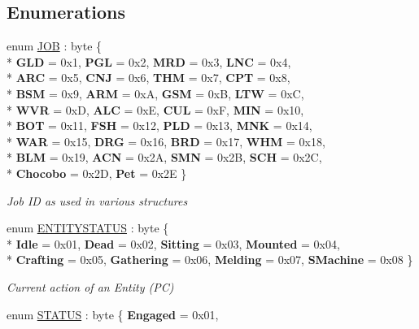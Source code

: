 \subsection*{Enumerations}
\begin{DoxyCompactItemize}
\item 
enum \hyperlink{namespaceffxivlib_a7273810711af045adb7151580e025a86}{J\-O\-B} \-: byte \{ \\*
{\bfseries G\-L\-D} = 0x1, 
{\bfseries P\-G\-L} = 0x2, 
{\bfseries M\-R\-D} = 0x3, 
{\bfseries L\-N\-C} = 0x4, 
\\*
{\bfseries A\-R\-C} = 0x5, 
{\bfseries C\-N\-J} = 0x6, 
{\bfseries T\-H\-M} = 0x7, 
{\bfseries C\-P\-T} = 0x8, 
\\*
{\bfseries B\-S\-M} = 0x9, 
{\bfseries A\-R\-M} = 0x\-A, 
{\bfseries G\-S\-M} = 0x\-B, 
{\bfseries L\-T\-W} = 0x\-C, 
\\*
{\bfseries W\-V\-R} = 0x\-D, 
{\bfseries A\-L\-C} = 0x\-E, 
{\bfseries C\-U\-L} = 0x\-F, 
{\bfseries M\-I\-N} = 0x10, 
\\*
{\bfseries B\-O\-T} = 0x11, 
{\bfseries F\-S\-H} = 0x12, 
{\bfseries P\-L\-D} = 0x13, 
{\bfseries M\-N\-K} = 0x14, 
\\*
{\bfseries W\-A\-R} = 0x15, 
{\bfseries D\-R\-G} = 0x16, 
{\bfseries B\-R\-D} = 0x17, 
{\bfseries W\-H\-M} = 0x18, 
\\*
{\bfseries B\-L\-M} = 0x19, 
{\bfseries A\-C\-N} = 0x2\-A, 
{\bfseries S\-M\-N} = 0x2\-B, 
{\bfseries S\-C\-H} = 0x2\-C, 
\\*
{\bfseries Chocobo} = 0x2\-D, 
{\bfseries Pet} = 0x2\-E
 \}
\begin{DoxyCompactList}\small\item\em Job I\-D as used in various structures \end{DoxyCompactList}\item 
enum \hyperlink{namespaceffxivlib_a93f054414b7ccf7ba7c36f54fcc392f5}{E\-N\-T\-I\-T\-Y\-S\-T\-A\-T\-U\-S} \-: byte \{ \\*
{\bfseries Idle} = 0x01, 
{\bfseries Dead} = 0x02, 
{\bfseries Sitting} = 0x03, 
{\bfseries Mounted} = 0x04, 
\\*
{\bfseries Crafting} = 0x05, 
{\bfseries Gathering} = 0x06, 
{\bfseries Melding} = 0x07, 
{\bfseries S\-Machine} = 0x08
 \}
\begin{DoxyCompactList}\small\item\em Current action of an Entity (P\-C) \end{DoxyCompactList}\item 
enum \hyperlink{namespaceffxivlib_a856915176aeab1f9b643c0243cb008ee}{S\-T\-A\-T\-U\-S} \-: byte \{ {\bfseries Engaged} = 0x01, 

\end{DoxyCompactItemize}
